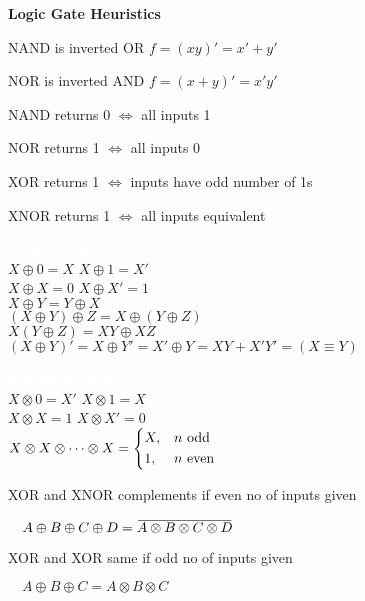\documentclass[twocolumn]{article}
\newcommand{\overbar}[1]{\mkern 1.5mu\overline{\mkern-1.5mu#1\mkern-1.5mu}\mkern 1.5mu}
\begin{document}
\cleardoublepage


\textbf{Logic Gate Heuristics}

NAND is inverted OR \hfill $f = (xy)' = x' + y'$

NOR is inverted AND \hfill $f = (x+y)' = x'y'$

NAND returns 0 $\iff$ all inputs 1

NOR returns 1 $\iff$ all inputs 0

XOR returns 1 $\iff$ inputs have odd number of 1s

XNOR returns 1 $\iff$ all inputs equivalent

\begin{tcolorbox}[width=\columnwidth, sharp corners, tabularx={*{1}{X}l}]
     \textbf{\textcolor{white}{XOR Properties}} \\
    $X \oplus 0 = X$ \hfill $X \oplus 1 = X'$ \\
    $X \oplus X = 0$ \hfill $X \oplus X' = 1$ \\
    $X \oplus Y = Y \oplus X$ \\
    $(X \oplus Y) \oplus Z = X \oplus (Y \oplus Z)$ \\
    $X(Y \oplus Z) = XY \oplus XZ$ \\
    $(X \oplus Y)' = X \oplus Y' = X' \oplus Y = XY + X'Y' = (X \equiv Y)$
\end{tcolorbox}

\begin{tcolorbox}[width=\columnwidth, sharp corners, tabularx={*{1}{X}l}]
     \textbf{\textcolor{white}{XNOR Properties}} \\
    $X \otimes 0 = X'$ \hfill $X \otimes 1 = X$ \\
    $X \otimes X = 1$ \hfill $X \otimes X' = 0$ \\
    $X \otimes X \otimes \cdots \otimes X = \begin{dcases} X, & n \text{ odd} \\ 1, & n \text{ even} \end{dcases}$
\end{tcolorbox}

XOR and XNOR complements if even no of inputs given

$\quad A \oplus B \oplus C \oplus D = \overbar{A \otimes B \otimes C \otimes D}$

XOR and XOR same if odd no of inputs given

$\quad A \oplus B \oplus C = A \otimes B \otimes C$

\vspace{-.5em}
\dotfill
\end{document}
